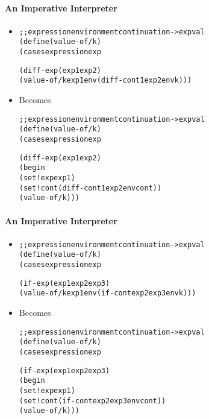 \documentclass{beamer}
\begin{document}
\begin{frame}[fragile]
\framesubtitle{An Imperative Interpreter}
\begin{scriptsize}
\begin{itemize}
\item<1->
\begin{alltt}
;; expression environment continuation -> expval
(define (value-of/k)
  (cases expression exp

    (diff-exp (exp1 exp2)
              (value-of/k exp1 env (diff-cont1 exp2 env k)))
\end{alltt}

\item<1-> Becomes
\begin{alltt}
;; expression environment continuation -> expval
(define (value-of/k)
  (cases expression exp

    (diff-exp (exp1 exp2)
              (begin
                (set! exp exp1)
                (set! cont (diff-cont1 exp2 env cont))
                (value-of/k)))
\end{alltt}

\end{itemize}
\end{scriptsize}
\end{frame}

\begin{frame}[fragile]
\framesubtitle{An Imperative Interpreter}
\begin{scriptsize}
\begin{itemize}
\item<1->
\begin{alltt}
;; expression environment continuation -> expval
(define (value-of/k)
  (cases expression exp

    (if-exp (exp1 exp2 exp3)
            (value-of/k exp1 env (if-cont exp2 exp3 env k)))
\end{alltt}

\item<1-> Becomes
\begin{alltt}
;; expression environment continuation -> expval
(define (value-of/k)
  (cases expression exp

    (if-exp (exp1 exp2 exp3)
            (begin
              (set! exp exp1)
              (set! cont (if-cont exp2 exp3 env cont))
              (value-of/k)))
\end{alltt}

\end{itemize}
\end{scriptsize}
\end{frame}
\end{document}

